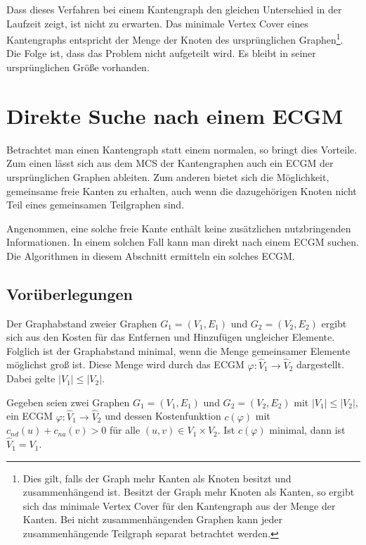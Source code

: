 Dass dieses Verfahren bei einem Kantengraph den gleichen Unterschied in der Laufzeit 
zeigt, ist nicht zu erwarten. Das minimale Vertex Cover eines Kantengraphs entspricht 
der Menge der Knoten des ursprünglichen Graphen\footnote{Dies gilt, falls der Graph 
mehr Kanten als Knoten besitzt und zusammenhängend ist. Besitzt der Graph mehr Knoten 
als Kanten, so ergibt sich das minimale Vertex Cover für den Kantengraph aus der Menge 
der Kanten. Bei nicht zusammenhängenden Graphen kann jeder zusammenhängende Teilgraph 
separat betrachtet werden.}. Die Folge ist, dass das Problem nicht aufgeteilt wird. 
Es bleibt in seiner ursprünglichen Größe vorhanden. 

\section{Direkte Suche nach einem ECGM}
Betrachtet man einen Kantengraph statt einem normalen, so bringt dies Vorteile. 
Zum einen lässt sich aus dem MCS der Kantengraphen auch ein ECGM der ursprünglichen 
Graphen ableiten. Zum anderen bietet sich die Möglichkeit, gemeinsame freie 
Kanten zu erhalten, auch wenn die dazugehörigen Knoten nicht Teil eines gemeinsamen 
Teilgraphen sind.

Angenommen, eine solche freie Kante enthält keine zusätzlichen nutzbringenden 
Informationen. In einem solchen Fall kann man direkt nach einem ECGM suchen. Die 
Algorithmen in diesem Abschnitt ermitteln ein solches ECGM. 

\subsection{Vorüberlegungen}\label{Vorueberlegungen}
Der Graphabstand zweier Graphen $G_1=(V_1,E_1)$ und $G_2=(V_2,E_2)$ ergibt sich aus 
den Kosten für das Entfernen und Hinzufügen ungleicher Elemente. Folglich ist der 
Graphabstand minimal, wenn die Menge gemeinsamer Elemente möglichst groß ist. Diese 
Menge wird durch das ECGM $\varphi:\hat{V}_1 \rightarrow \hat{V}_2$ dargestellt. 
Dabei gelte $|V_1| \leq |V_2|$. 

\begin{myTheo}\label{alleVausV1enthalten}
Gegeben seien zwei Graphen $G_1=(V_1,E_1)$ und $G_2=(V_2,E_2)$ mit 
$|V_1|\leq|V_2|$, ein ECGM $\varphi:\hat{V}_1 \rightarrow 
\hat{V}_2$ und dessen Kostenfunktion $c(\varphi)$ mit $c_{nd}(u) + c_{na}(v) > 0$ 
für alle $(u,v) \in V_1 \times V_2$. Ist $c(\varphi)$ minimal, dann ist $\hat{V}_1=V_1$.
\end{myTheo}

